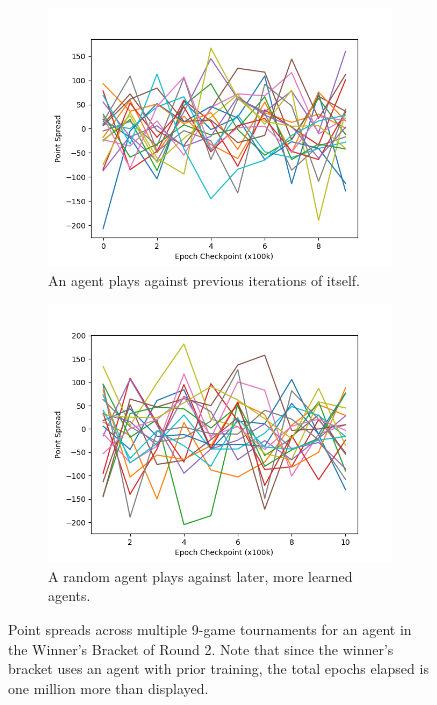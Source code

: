 
\begin{figure}
\center

\begin{subfigure}[b]{0.90\textwidth}
	\includegraphics[width=\linewidth]{images/findings/round2/spreads_self-v-prev_winner.png}
	\caption{An agent plays against previous iterations of itself.}
	\label{fig:r2-spreads-winner-a}
\end{subfigure}

\begin{subfigure}[b]{0.90\textwidth}
	\includegraphics[width=\linewidth]{images/findings/round2/spreads_rand-v-fut_winner.png}
	\caption{A random agent plays against later, more learned agents.}
	\label{fig:r2-spreads-winner-b}
\end{subfigure}

\caption{
	Point spreads across multiple 9-game tournaments for an agent in the
	Winner's Bracket of Round 2.
	Note that since the winner's bracket uses an agent with prior training,
	the total epochs elapsed is one million more than displayed.
}
\label{fig:r2-spreads-winner}
\end{figure}
